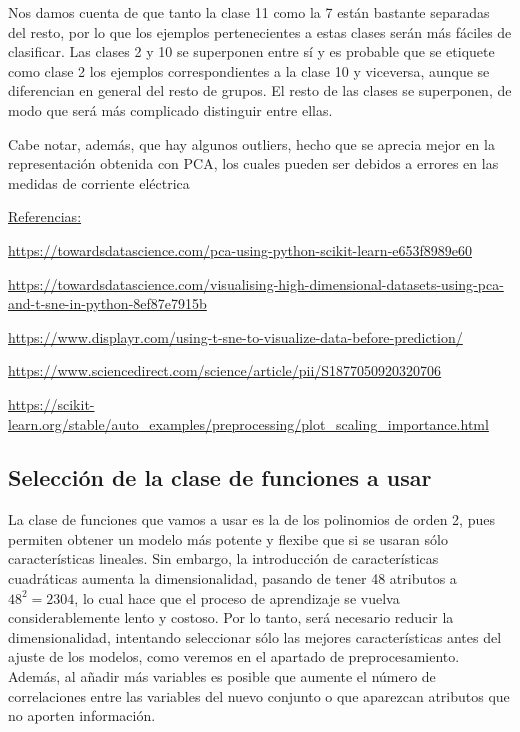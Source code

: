 \documentclass[a4]{article}
\begin{document}
Nos damos cuenta de que tanto la clase 11 como la 7 están bastante separadas del resto, por lo que los ejemplos pertenecientes a estas clases serán más fáciles de clasificar. Las clases 2 y 10 se superponen entre sí y es probable que se etiquete como clase 2 los ejemplos correspondientes a la clase 10 y viceversa, aunque se diferencian en general del resto de grupos. El resto de las clases se superponen, de modo que será más complicado distinguir entre ellas. 

Cabe notar, además, que hay algunos outliers, hecho que se aprecia mejor en la representación obtenida con PCA, los cuales pueden ser debidos a errores en las medidas de corriente eléctrica

\underline{Referencias:}

 \href{https://towardsdatascience.com/pca-using-python-scikit-learn-e653f8989e60}{https://towardsdatascience.com/pca-using-python-scikit-learn-e653f8989e60}

 \href{https://towardsdatascience.com/visualising-high-dimensional-datasets-using-pca-and-t-sne-in-python-8ef87e7915b}{https://towardsdatascience.com/visualising-high-dimensional-datasets-using-pca-and-t-sne-in-python-8ef87e7915b}
 
 \href{https://www.displayr.com/using-t-sne-to-visualize-data-before-prediction/}{https://www.displayr.com/using-t-sne-to-visualize-data-before-prediction/}
 
\href{https://www.sciencedirect.com/science/article/pii/S1877050920320706}{https://www.sciencedirect.com/science/article/pii/S1877050920320706}

\href{https://scikit-learn.org/stable/auto_examples/preprocessing/plot_scaling_importance.html}{https://scikit-learn.org/stable/auto\_examples/preprocessing/plot\_scaling\_importance.html}
\newpage
\subsection{Selección de la clase de funciones a usar}

La clase de funciones que vamos a usar es la de los polinomios de orden 2, pues permiten obtener un modelo más potente y flexibe que si se usaran sólo características lineales. Sin embargo, la introducción de características cuadráticas aumenta la dimensionalidad, pasando de tener 48 atributos a $48^2=2304$, lo cual hace que el proceso de aprendizaje se vuelva considerablemente lento y costoso. Por lo tanto, será necesario reducir la dimensionalidad, intentando seleccionar sólo las mejores características antes del ajuste de los modelos, como veremos en el apartado de preprocesamiento. Además, al añadir más variables es posible que aumente el número de correlaciones entre las variables del nuevo conjunto o que aparezcan atributos que no aporten información.
\end{document}
